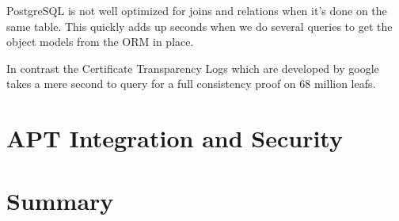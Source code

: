\documentclass[../Main/thesis.tex]{subfiles}
\begin{document}
PostgreSQL is not well optimized for joins and relations when it's done on the
same table. This quickly adds up seconds when we do several queries to get the
object models from the ORM in place.

In contrast the Certificate Transparency Logs which are developed by google
takes a mere second to query for a full consistency proof on 68 million leafs.



\section{APT Integration and Security}%
\label{sec:apt_integration_and_security}


\section{Summary}%
\label{sec:evaluation_summary}


\blankpage
\end{document}
